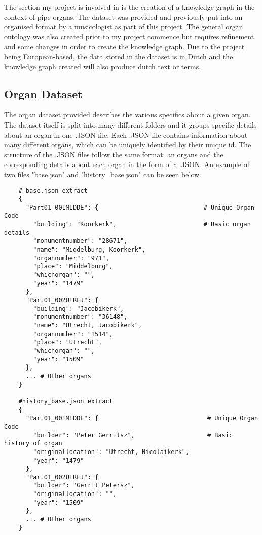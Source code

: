 The section my project is involved in is the creation of a knowledge graph in the context of pipe organs. The dataset was provided and previously put into an organised format by a musicologist as part of this project. The general organ ontology was also created prior to my project commence but requires refinement and some changes in order to create the knowledge graph. Due to the project being European-based, the data stored in the dataset is in Dutch and the knowledge graph created will also produce dutch text or terms.  

\subsection{Organ Dataset}
\hspace{0.5cm} The organ dataset provided describes the various specifics about a given organ. The dataset itself is split into many different folders and it groups specific details about an organ in one .JSON file. Each .JSON file contains information about many different organs, which can be uniquely identified by their unique id. The structure of the .JSON files follow the same format: an organs and the corresponding details about each organ in the form of a .JSON. An example of two files "base.json" and "history\_base.json" can be seen below. 

\begin{lstlisting}
    # base.json extract
    {
      "Part01_001MIDDE": {                             # Unique Organ Code
        "building": "Koorkerk",                        # Basic organ details
        "monumentnumber": "28671",
        "name": "Middelburg, Koorkerk",
        "organnumber": "971",
        "place": "Middelburg",
        "whichorgan": "",
        "year": "1479"
      },
      "Part01_002UTREJ": {
        "building": "Jacobikerk",
        "monumentnumber": "36148",
        "name": "Utrecht, Jacobikerk",
        "organnumber": "1514",
        "place": "Utrecht",
        "whichorgan": "",
        "year": "1509"
      },
      ... # Other organs
    }

    #history_base.json extract
    {
      "Part01_001MIDDE": {                              # Unique Organ Code
        "builder": "Peter Gerritsz",                    # Basic history of organ
        "originallocation": "Utrecht, Nicolaikerk",
        "year": "1479"
      },
      "Part01_002UTREJ": {
        "builder": "Gerrit Petersz",
        "originallocation": "",
        "year": "1509"
      },
      ... # Other organs
    }
\end{lstlisting}

